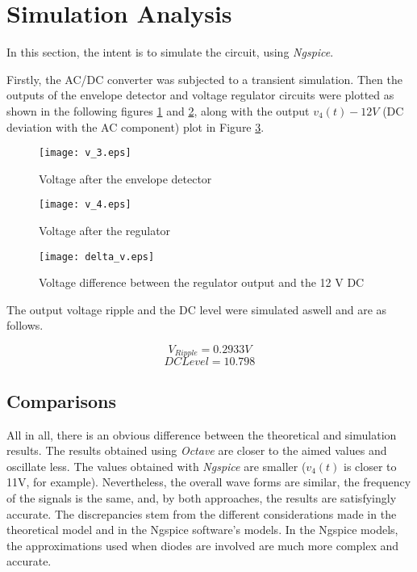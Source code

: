 \section{Simulation Analysis}
\label{sec:simulation}

In this section, the intent is to simulate the circuit, using \textit{Ngspice}.

Firstly, the AC/DC converter was subjected to a transient simulation. Then the outputs of the envelope detector and voltage regulator circuits were plotted as shown in the following figures \ref{plot5} and \ref{plot6}, along with the output $v_4(t)-12V$ (DC deviation with the AC component) plot in Figure \ref{plot7}. 

\begin{figure}[h]
    \centering
    \texttt{[image: v\_3.eps]}
    \caption{Voltage after the envelope detector}
    \label{plot5}
\end{figure}

\begin{figure}[h]
    \centering
    \texttt{[image: v\_4.eps]}
    \caption{Voltage after the regulator}
    \label{plot6}
\end{figure}

\begin{figure}[h]
\centering
\texttt{[image: delta\_v.eps]}
\caption{Voltage difference between the regulator output and the 12 V DC}
\label{plot7}
\end{figure}

\clearpage

The output voltage ripple and the DC level were simulated aswell and are as follows.

\begin{equation}
    V_{Ripple} = 0.2933 V
\end{equation}
\begin{equation}
    DC Level = 10.798
\end{equation}


\subsection{Comparisons}
\label{subsec:compare}




All in all, there is an obvious difference between the theoretical and simulation results. The results obtained using \textit{Octave} are closer to the aimed values and oscillate less. The values obtained with \textit{Ngspice} are smaller ($v_4(t)$ is closer to 11V, for example). Nevertheless, the overall wave forms are similar, the frequency of the signals is the same, and, by both approaches, the results are satisfyingly accurate. 
The discrepancies stem from the different considerations made in the theoretical model and in the Ngspice software's models. In the Ngspice models, the approximations used when diodes are involved are much more complex and accurate.

